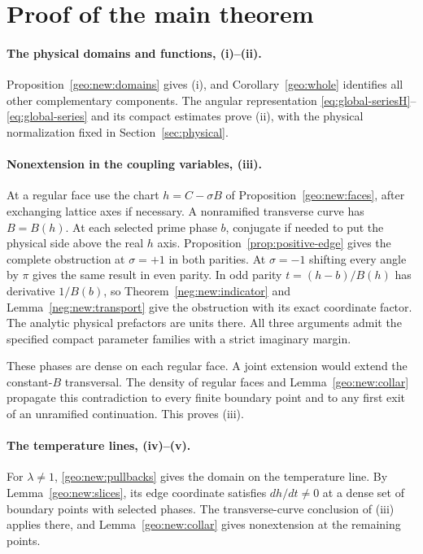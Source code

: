 \documentclass[11pt]{article}
\numberwithin{equation}{section}
\theoremstyle{definition}
\begin{document}
\section{Proof of the main theorem}\label{sec:assembly}

\paragraph{The physical domains and functions, (i)--(ii).}
Proposition~\ref{geo:new:domains} gives (i), and
Corollary~\ref{geo:whole} identifies all other complementary components.
The angular representation \eqref{eq:global-seriesH}--\eqref{eq:global-series}
and its compact estimates prove (ii), with the physical normalization
fixed in Section~\ref{sec:physical}.

\paragraph{Nonextension in the coupling variables, (iii).}
At a regular face use the chart $h=C-\sigma B$ of
Proposition~\ref{geo:new:faces}, after exchanging lattice axes
if necessary. A nonramified transverse curve has $B=B(h)$.
At each selected prime phase $b$, conjugate if needed to put the
physical side above the real $h$ axis. Proposition~\ref{prop:positive-edge}
gives the complete obstruction at $\sigma=+1$ in both parities.
At $\sigma=-1$ shifting every angle by $\pi$ gives the same result in
even parity. In odd parity $t=(h-b)/B(h)$ has derivative $1/B(b)$,
so Theorem~\ref{neg:new:indicator} and Lemma~\ref{neg:new:transport}
give the obstruction with its exact coordinate factor. The analytic
physical prefactors are units there. All three arguments admit the
specified compact parameter families with a strict imaginary margin.

These phases are dense on each regular face. A joint extension
would extend the constant-$B$ transversal. The density of regular
faces and Lemma~\ref{geo:new:collar} propagate this contradiction
to every finite boundary point and to any first exit of an unramified
continuation. This proves (iii).

\paragraph{The temperature lines, (iv)--(v).}
For $\lambda\ne1$, \eqref{geo:new:pullbacks} gives the domain on the
temperature line. By Lemma~\ref{geo:new:slices}, its edge coordinate
satisfies $dh/dt\ne0$ at a dense set of boundary points with selected
phases. The transverse-curve conclusion of (iii) applies there, and
Lemma~\ref{geo:new:collar} gives nonextension at the remaining points.
\end{document}

